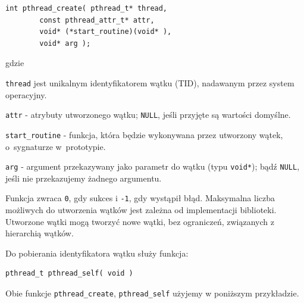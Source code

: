 \begin{lstlisting}[style=MyCStyle]
int pthread_create( pthread_t* thread,
		const pthread_attr_t* attr,
		void* (*start_routine)(void* ),
		void* arg );
\end{lstlisting}

gdzie

\begin{myitemize}
\item \lstinline[style=MyCStyle]{thread} jest unikalnym identyfikatorem wątku (TID), nadawanym przez system operacyjny.
\item \lstinline[style=MyCStyle]{attr} - atrybuty utworzonego wątku; \lstinline[style=MyCStyle]{NULL}, jeśli przyjęte są wartości domyślne.
\item \lstinline[style=MyCStyle]{start_routine} - funkcja, która będzie wykonywana przez utworzony wątek, o~sygnaturze w~prototypie.
\item \lstinline[style=MyCStyle]{arg} - argument przekazywany jako parametr do wątku (typu \lstinline[style=MyCStyle]{void*}); bądź \lstinline[style=MyCStyle]{NULL}, jeśli nie przekazujemy żadnego argumentu.
\end{myitemize}

Funkcja zwraca \lstinline[style=MyCStyle]{0}, gdy sukces i \lstinline[style=MyCStyle]{-1}, gdy wystąpił błąd. Maksymalna liczba możliwych do utworzenia wątków jest zależna od implementacji biblioteki. Utworzone wątki mogą tworzyć nowe wątki, bez ograniczeń, związanych z hierarchią wątków.

Do pobierania identyfikatora wątku służy funkcja:

\begin{lstlisting}[style=MyCStyle]
pthread_t pthread_self( void )
\end{lstlisting}

Obie funkcje \lstinline[style=MyCStyle]{pthread_create}, \lstinline[style=MyCStyle]{pthread_self} użyjemy w poniższym przykładzie.


